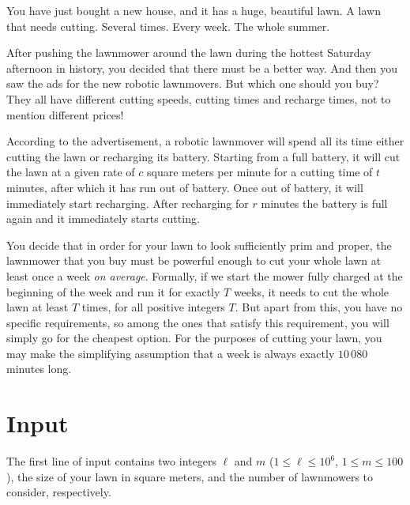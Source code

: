 
%
\noindent
You have just bought a new house, and it has a huge, beautiful lawn. A
lawn that needs cutting. Several times. Every week. The whole summer.

After pushing the lawnmower around the lawn during the hottest
Saturday afternoon in history, you decided that there must be a better
way. And then you saw the ads for the new robotic
lawnmovers. But which one should you buy? They all have different
cutting speeds, cutting times and recharge times, not to mention
different prices!

According to the advertisement, a robotic lawnmover will
spend all its time either cutting the lawn or
recharging its battery.  Starting from a full battery, it will cut the
lawn at a given rate of $c$ square meters per minute for a cutting
time of $t$ minutes, after which it has run out of battery. Once out
of battery, it will immediately start recharging.  After recharging for $r$ minutes the battery is full again and it immediately starts cutting.

You decide that in order for your lawn to look sufficiently prim and
proper, the lawnmower that you buy must be powerful enough to cut your
whole lawn at least once a week \emph{on average}. Formally, if we
start the mower fully charged at the beginning of the week and run it
for exactly $T$ weeks, it needs to cut the whole lawn at least $T$ times,
for all positive integers $T$.  But apart from this, you have no specific
requirements, so among the ones that satisfy this requirement, you
will simply go for the cheapest option.  For the purposes of cutting
your lawn, you may make the simplifying assumption that a week is
always exactly $10\,080$ minutes long.

\section*{Input}

The first line of input contains two integers $\ell$ and $m$
($1 \le \ell \le 10^6$, $1 \le m \le 100$), the size of your lawn in
square meters, and the number of lawnmowers to consider, respectively.

